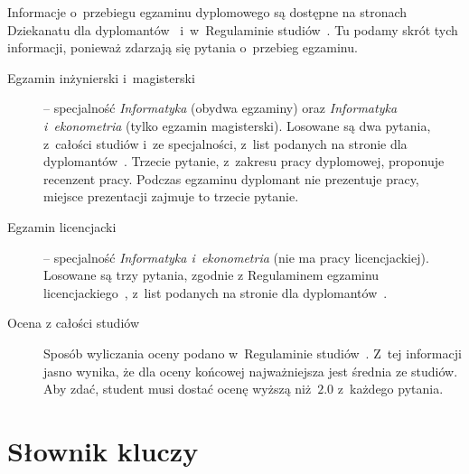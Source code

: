 Informacje o~przebiegu egzaminu dyplomowego są dostępne na stronach Dziekanatu dla dyplomantów~ i~w~Regulaminie studiów~\cite[Rozdział~XII]{regulamin-studiow}. Tu podamy skrót tych informacji, ponieważ zdarzają się pytania o~przebieg egzaminu.
\begin{description}
  \item[Egzamin inżynierski i~magisterski] -- specjalność {\em Informatyka} (obydwa egzaminy) oraz {\em Informatyka i~ekonometria} (tylko egzamin magisterski). Losowane są dwa pytania, z~całości studiów i~ze specjalności, z~list podanych na stronie dla dyplomantów~. Trzecie pytanie, z~zakresu pracy dyplomowej, proponuje recenzent pracy. Podczas egzaminu dyplomant nie prezentuje pracy, miejsce prezentacji zajmuje to trzecie pytanie.
  \item[Egzamin licencjacki] -- specjalność {\em Informatyka i~ekonometria} (nie ma pracy licencjackiej). Losowane są trzy pytania, zgodnie z Regulaminem egzaminu licencjackiego~, z~list podanych na stronie dla dyplomantów~.
  \item[Ocena z całości studiów] Sposób wyliczania oceny podano w~Regulaminie studiów~\cite[Rozdział~XIII]{regulamin-studiow}. Z~tej informacji jasno wynika, że dla oceny końcowej najważniejsza jest średnia ze studiów. Aby zdać, student musi dostać ocenę wyższą niż~$2.0$ z~każdego pytania.
\end{description}


\newpage

\section{Słownik kluczy}
\label{sec:dod:slownik}


